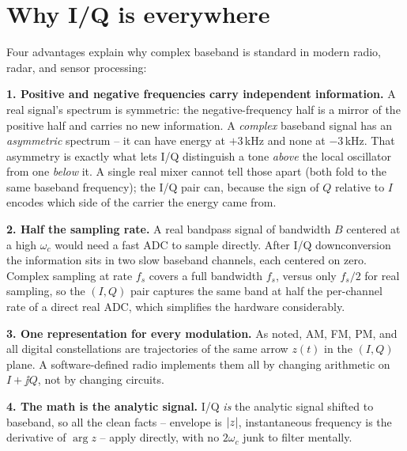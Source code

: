 \section{Why I/Q is everywhere}
\label{ch23:why-iq}

Four advantages explain why complex baseband is standard in modern radio, radar, and sensor processing:

\textbf{1. Positive and negative frequencies carry independent information.} A real signal's spectrum is symmetric:
the negative-frequency half is a mirror of the positive half and carries no new
information. A \emph{complex} baseband signal has an \emph{asymmetric} spectrum -- it can
have energy at $+3\,$kHz and none at $-3\,$kHz. That asymmetry is exactly what lets I/Q
distinguish a tone \emph{above} the local oscillator from one \emph{below} it. A single
real mixer cannot tell those apart (both fold to the same baseband frequency); the I/Q
pair can, because the sign of $Q$ relative to $I$ encodes which side of the carrier the
energy came from.

\textbf{2. Half the sampling rate.} A real bandpass signal of bandwidth $B$ centered at a
high $\omega_c$ would need a fast ADC to sample directly. After I/Q downconversion the
information sits in two slow baseband channels, each centered on zero. Complex sampling at
rate $f_s$ covers a full bandwidth $f_s$, versus only $f_s/2$ for real sampling, so the
$(I,Q)$ pair captures the same band at half the per-channel rate of a direct real ADC,
which simplifies the hardware considerably.

\textbf{3. One representation for every modulation.} As noted, AM, FM, PM, and all
digital constellations are trajectories of the same arrow $z(t)$ in the $(I,Q)$
plane. A software-defined radio implements them all by changing arithmetic on $I+\jj Q$,
not by changing circuits.

\textbf{4. The math is the analytic signal.} I/Q \emph{is} the analytic signal shifted to
baseband, so all the clean facts -- envelope is $\lvert z\rvert$, instantaneous frequency is the
derivative of $\arg z$ -- apply directly, with no $2\omega_c$ junk to filter mentally.

